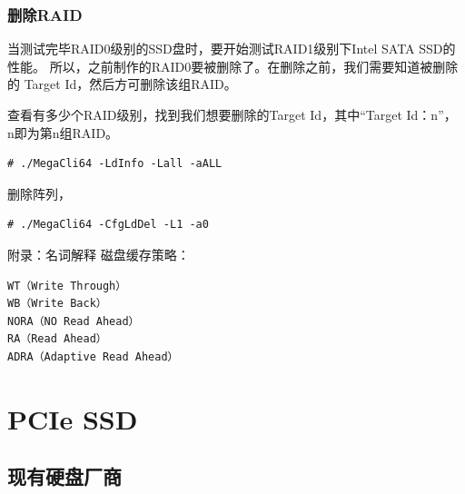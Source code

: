 \subsection{删除RAID}

当测试完毕RAID0级别的SSD盘时，要开始测试RAID1级别下Intel SATA SSD的性能。
所以，之前制作的RAID0要被删除了。在删除之前，我们需要知道被删除的
Target Id，然后方可删除该组RAID。

查看有多少个RAID级别，找到我们想要删除的Target Id，其中“Target Id：n”，
n即为第n组RAID。

\small{
\begin{verbatim}
# ./MegaCli64 -LdInfo -Lall -aALL 
\end{verbatim}
}
\normalsize

删除阵列，
\small{
\begin{verbatim}
# ./MegaCli64 -CfgLdDel -L1 -a0
\end{verbatim}
}
\normalsize
	
附录：名词解释
磁盘缓存策略：
\begin{verbatim}
WT（Write Through）
WB（Write Back）
NORA（NO Read Ahead）
RA（Read Ahead）
ADRA（Adaptive Read Ahead）
\end{verbatim}

\chapter{PCIe SSD}

\section{现有硬盘厂商}
